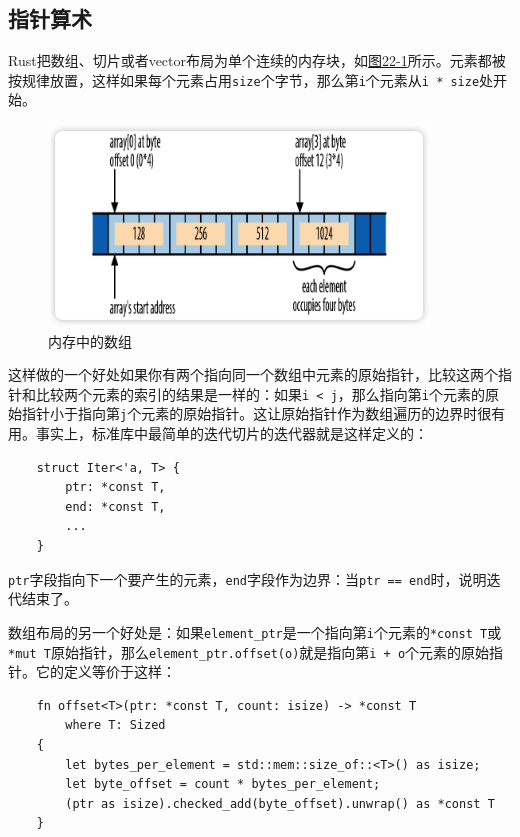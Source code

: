 \subsection{指针算术}

Rust把数组、切片或者vector布局为单个连续的内存块，如\hyperref[f22-1]{图22-1}所示。元素都被按规律放置，这样如果每个元素占用\texttt{size}个字节，那么第\texttt{i}个元素从\texttt{i * size}处开始。

\begin{figure}[htbp]
    \centering
    \includegraphics[width=0.9\textwidth]{../img/f22-1.png}
    \caption{内存中的数组}
    \label{f22-1}
\end{figure}

这样做的一个好处如果你有两个指向同一个数组中元素的原始指针，比较这两个指针和比较两个元素的索引的结果是一样的：如果\texttt{i < j}，那么指向第\texttt{i}个元素的原始指针小于指向第\texttt{j}个元素的原始指针。这让原始指针作为数组遍历的边界时很有用。事实上，标准库中最简单的迭代切片的迭代器就是这样定义的：
\begin{verbatim}
    struct Iter<'a, T> {
        ptr: *const T,
        end: *const T,
        ...
    }
\end{verbatim}

\texttt{ptr}字段指向下一个要产生的元素，\texttt{end}字段作为边界：当\texttt{ptr == end}时，说明迭代结束了。

数组布局的另一个好处是：如果\texttt{element\_ptr}是一个指向第\texttt{i}个元素的\texttt{*const T}或\texttt{*mut T}原始指针，那么\texttt{element\_ptr.offset(o)}就是指向第\texttt{i + o}个元素的原始指针。它的定义等价于这样：
\begin{verbatim}
    fn offset<T>(ptr: *const T, count: isize) -> *const T
        where T: Sized
    {
        let bytes_per_element = std::mem::size_of::<T>() as isize;
        let byte_offset = count * bytes_per_element;
        (ptr as isize).checked_add(byte_offset).unwrap() as *const T
    }
\end{verbatim}

